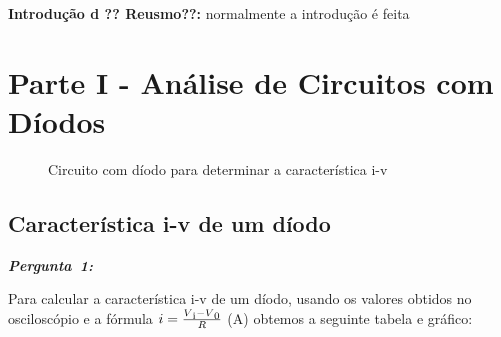 \documentclass[pdftex,12pt,a4paper]{report}
\begin{document}
\renewcommand{\headrulewidth}{0pt}

\vspace*{\fill}
\textbf{Introdução  d  ?? Reusmo??:}
\begingroup
normalmente a introdução é feita
\endgroup
\vspace*{\fill}
\newpage

\renewcommand*\contentsname{Conteúdos}
\renewcommand*\figurename{Figura}
\renewcommand*\tablename{Tabela}

\tableofcontents
\renewcommand{\headrulewidth}{0.15pt}
\renewcommand{\thechapter}{}

\clearpage

\section{Parte I - Análise de Circuitos com Díodos}
\begin{figure}[h]
\centerline{}
\caption{Circuito com díodo para determinar a característica i-v}\label{diodo_parte1}
\end{figure}

\subsection{Característica i-v de um díodo}
\hbox{\emph{\textbf{Pergunta 1:}}\newline\newline}

Para calcular a característica i-v de um díodo, usando os valores obtidos no osciloscópio e a fórmula $i = \frac{V\textsubscript{i}-V\textsubscript{0}}{R}$ (A) obtemos a seguinte tabela e gráfico:\newline

\endminipage\hfill
{}
\endminipage\hfill
\end{document}
